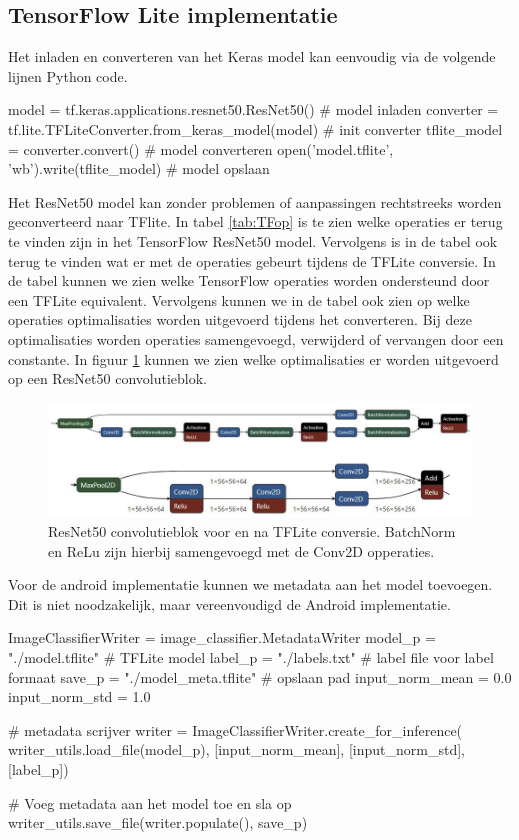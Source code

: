 \subsection{TensorFlow Lite implementatie} \label{tf_h_conv}
Het inladen en converteren van het Keras model kan eenvoudig via de volgende lijnen Python code.

\begin{python}
model = tf.keras.applications.resnet50.ResNet50() # model inladen
converter = tf.lite.TFLiteConverter.from_keras_model(model) # init converter
tflite_model = converter.convert() # model converteren
open('model.tflite', 'wb').write(tflite_model) # model opslaan
\end{python}

Het ResNet50 model kan zonder problemen of aanpassingen rechtstreeks worden geconverteerd naar TFlite.
In tabel \ref{tab:TFop} is te zien welke operaties er terug te vinden zijn in het TensorFlow ResNet50 model.
Vervolgens is in de tabel ook terug te vinden wat er met de operaties gebeurt tijdens de TFLite conversie.
In de tabel kunnen we zien welke TensorFlow operaties worden ondersteund door een TFLite equivalent.
Vervolgens kunnen we in de tabel ook zien op welke operaties optimalisaties worden uitgevoerd tijdens het converteren.
Bij deze optimalisaties worden operaties samengevoegd, verwijderd of vervangen door een constante.
In figuur \ref{fig:class_opt} kunnen we zien welke optimalisaties er worden uitgevoerd op een ResNet50 convolutieblok.

\begin{figure}[!ht]
	\centering
	\includegraphics[width=1.0\linewidth]{fig/class_opt.jpg}
	\caption{ResNet50 convolutieblok voor en na TFLite conversie. BatchNorm en ReLu zijn hierbij samengevoegd met de Conv2D opperaties.}
	\label{fig:class_opt}
\end{figure}

Voor de android implementatie kunnen we metadata aan het model toevoegen.
Dit is niet noodzakelijk, maar vereenvoudigd de Android implementatie.
\begin{python} 
ImageClassifierWriter = image_classifier.MetadataWriter
model_p = "./model.tflite" # TFLite model
label_p = "./labels.txt" # label file voor label formaat
save_p = "./model_meta.tflite" # opslaan pad
input_norm_mean = 0.0
input_norm_std = 1.0
    
# metadata scrijver
writer = ImageClassifierWriter.create_for_inference(
    writer_utils.load_file(model_p), [input_norm_mean], [input_norm_std],
    [label_p])
    
# Voeg metadata aan het model toe en sla op
writer_utils.save_file(writer.populate(), save_p)
\end{python}

